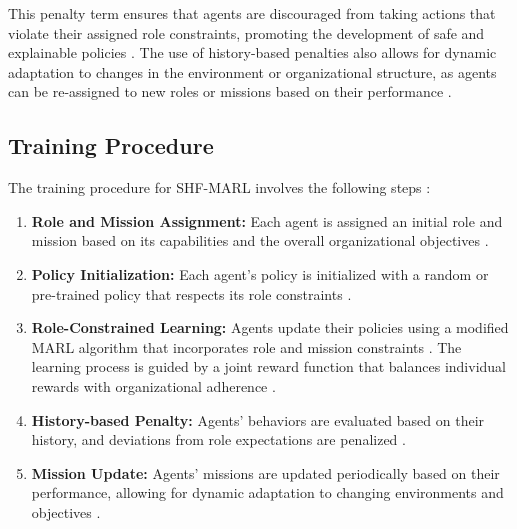\documentclass[sigconf,anonymous]{aamas}
\begin{document}
This penalty term ensures that agents are discouraged from taking actions that violate their assigned role constraints, promoting the development of safe and explainable policies \cite{wei2019safe}. The use of history-based penalties also allows for dynamic adaptation to changes in the environment or organizational structure, as agents can be re-assigned to new roles or missions based on their performance \cite{foerster2018counterfactual}.


\subsection{Training Procedure}
The training procedure for SHF-MARL involves the following steps \cite{foerster2018counterfactual}:

\begin{enumerate}
    \item \textbf{Role and Mission Assignment:} Each agent is assigned an initial role and mission based on its capabilities and the overall organizational objectives \cite{hubner2010moise}.
    \item \textbf{Policy Initialization:} Each agent's policy is initialized with a random or pre-trained policy that respects its role constraints \cite{foerster2018counterfactual, hubner2010moise}.
    \item \textbf{Role-Constrained Learning:} Agents update their policies using a modified MARL algorithm that incorporates role and mission constraints \cite{hubner2010moise}. The learning process is guided by a joint reward function that balances individual rewards with organizational adherence \cite{lowe2017multi}.
    \item \textbf{History-based Penalty:} Agents' behaviors are evaluated based on their history, and deviations from role expectations are penalized \cite{wei2019safe}.
    \item \textbf{Mission Update:} Agents' missions are updated periodically based on their performance, allowing for dynamic adaptation to changing environments and objectives \cite{hubner2010moise, soule2024}.
\end{enumerate}

\end{document}
